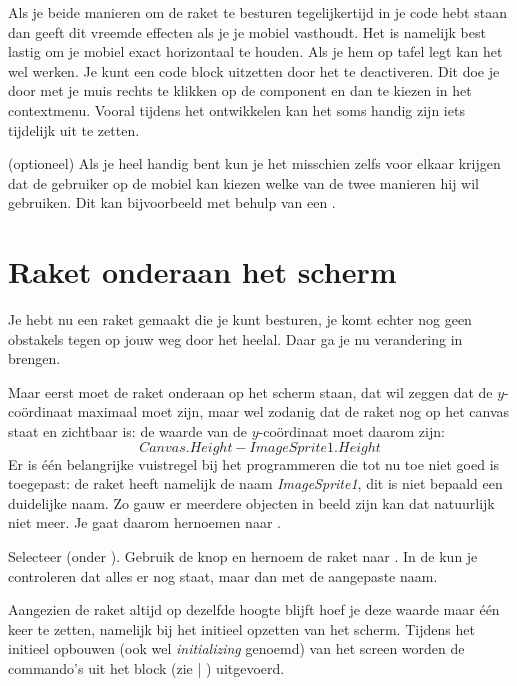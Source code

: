 
Als je beide manieren om de raket te besturen tegelijkertijd in je code hebt staan dan geeft dit vreemde effecten als je je mobiel vasthoudt. Het is namelijk best lastig om je mobiel exact horizontaal te houden. Als je hem op tafel legt kan het wel werken. Je kunt een code block uitzetten door het te deactiveren. Dit doe je door met je muis rechts te klikken op de component en dan  te kiezen in het contextmenu. Vooral tijdens het ontwikkelen kan het soms handig zijn iets tijdelijk uit te zetten. 

\begin{opgave}
   \opgVraag (optioneel)
	Als je heel handig bent kun je het misschien zelfs voor elkaar krijgen dat de gebruiker op de mobiel kan kiezen welke van de twee manieren hij wil gebruiken. Dit kan bijvoorbeeld met behulp van een .
\end{opgave}

\section{Raket onderaan het scherm}
Je hebt nu een raket gemaakt die je kunt besturen, je komt echter nog geen obstakels tegen op jouw weg door het heelal. Daar ga je nu verandering in brengen. 

Maar eerst moet de raket onderaan op het scherm staan, dat wil zeggen dat de $y$-co\"ordinaat maximaal moet zijn, maar wel zodanig dat de raket nog op het canvas staat en zichtbaar is: de waarde van de $y$-co\"ordinaat moet daarom zijn:  
\[
	Canvas.Height - ImageSprite1.Height  
\]
Er is \'e\'en belangrijke vuistregel bij het programmeren die tot nu toe niet goed is toegepast: de raket heeft namelijk de naam \emph{ImageSprite1}, dit is niet bepaald een duidelijke naam. Zo gauw er meerdere objecten in beeld zijn kan dat natuurlijk niet meer. Je gaat daarom  hernoemen naar . 

\begin{opgave}
	\opgVraag
	Selecteer  (onder ). Gebruik de knop  en hernoem de raket naar . In de  kun je controleren dat alles er nog staat, maar dan met de aangepaste naam. 
\end{opgave}

Aangezien de raket altijd op dezelfde hoogte blijft hoef je deze waarde maar \'e\'en keer te zetten, namelijk bij het initieel opzetten van het scherm. Tijdens het initieel opbouwen (ook wel \emph{initializing} genoemd) van het screen worden de commando's uit het block  (zie  | ) uitgevoerd. 

